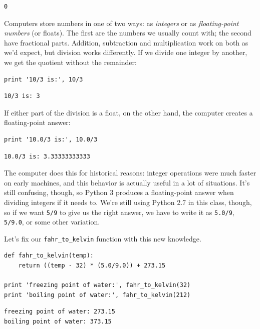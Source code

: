 \documentclass[]{book}
\newcommand{\gdef}[2]{\emph{#2}}
\begin{document}
\begin{verbatim}
0
\end{verbatim}

Computers store numbers in one of two ways: as
\gdef{g:integer}{integers} or as \gdef{g:float}{floating-point
numbers} (or floats). The first are the numbers we usually count with;
the second have fractional parts. Addition, subtraction and
multiplication work on both as we'd expect, but division works
differently. If we divide one integer by another, we get the quotient
without the remainder:

\begin{verbatim}
print '10/3 is:', 10/3
\end{verbatim}

\begin{verbatim}
10/3 is: 3
\end{verbatim}

If either part of the division is a float, on the other hand, the
computer creates a floating-point answer:

\begin{verbatim}
print '10.0/3 is:', 10.0/3
\end{verbatim}

\begin{verbatim}
10.0/3 is: 3.33333333333
\end{verbatim}

The computer does this for historical reasons: integer operations were
much faster on early machines, and this behavior is actually useful in a
lot of situations. It's still confusing, though, so Python 3 produces a
floating-point answer when dividing integers if it needs to. We're still
using Python 2.7 in this class, though, so if we want \texttt{5/9} to
give us the right answer, we have to write it as \texttt{5.0/9},
\texttt{5/9.0}, or some other variation.

Let's fix our \texttt{fahr\_to\_kelvin} function with this new
knowledge.

\begin{verbatim}
def fahr_to_kelvin(temp):
    return ((temp - 32) * (5.0/9.0)) + 273.15

print 'freezing point of water:', fahr_to_kelvin(32)
print 'boiling point of water:', fahr_to_kelvin(212)
\end{verbatim}

\begin{verbatim}
freezing point of water: 273.15
boiling point of water: 373.15
\end{verbatim}
\end{document}
